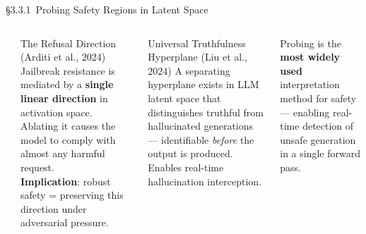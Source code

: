 \begin{frame}{\S3.3.1\ Probing Safety Regions in Latent Space}
\begin{columns}[T]
    {\small\bfseries{}}
    \begin{ucrcard}[UCRnavy]{The Refusal Direction (Arditi et al., 2024)}
      \scriptsize
      Jailbreak resistance is mediated by a \textbf{single linear direction} in activation space. Ablating it causes the model to comply with almost any harmful request.\\[3pt]
      \textbf{Implication}: robust safety = preserving this direction under adversarial pressure.
    \end{ucrcard}
    \vspace{0.3em}
    \begin{ucrcard}[UCRnavy]{Universal Truthfulness Hyperplane (Liu et al., 2024)}
      \scriptsize
      A separating hyperplane exists in LLM latent space that distinguishes truthful from hallucinated generations --- identifiable \emph{before} the output is produced.\\[3pt]
      Enables real-time hallucination interception.
    \end{ucrcard}
    \vspace{0.2em}
    \begin{ucrdark}[UCRnavy]
      \centering\scriptsize
      Probing is the \textbf{most widely used} interpretation method for safety --- enabling real-time detection of unsafe generation in a single forward pass.
    \end{ucrdark}
  \end{columns}
\end{frame}


